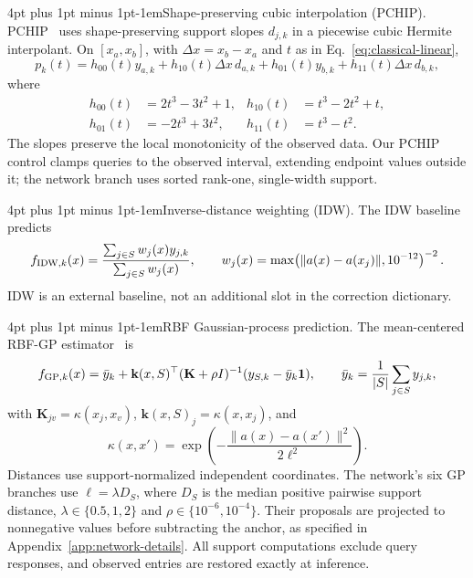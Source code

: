 \documentclass{article}
\makeatletter
\renewcommand{\paragraph}{\@startsection{paragraph}{4}{\z@}
  {4pt plus 1pt minus 1pt}{-1em}{\normalsize\bf}}
\makeatother
\begin{document}
\paragraph{Shape-preserving cubic interpolation (PCHIP).}
PCHIP~\citep{pchip} uses shape-preserving support slopes $d_{j,k}$ in a
piecewise cubic Hermite interpolant. On $[x_a,x_b]$, with
$\Delta x=x_b-x_a$ and $t$ as in Eq.~\eqref{eq:classical-linear},
\begin{equation}
\label{eq:classical-pchip}
 p_k(t)=h_{00}(t)y_{a,k}+h_{10}(t)\Delta x\,d_{a,k}
       +h_{01}(t)y_{b,k}+h_{11}(t)\Delta x\,d_{b,k},
\end{equation}
where
\begin{equation}
\begin{aligned}
 h_{00}(t)&=2t^3-3t^2+1, & h_{10}(t)&=t^3-2t^2+t,\\
 h_{01}(t)&=-2t^3+3t^2, & h_{11}(t)&=t^3-t^2.
\end{aligned}
\end{equation}
The slopes preserve the local monotonicity of the observed data. Our PCHIP
control clamps queries to the observed interval, extending endpoint values
outside it; the network branch uses sorted rank-one, single-width support.

\paragraph{Inverse-distance weighting (IDW).}
The IDW baseline predicts
\begin{equation}
\label{eq:classical-idw}
 f_{{\rm IDW},k}(x)=\frac{\sum_{j\in S}w_j(x)y_{j,k}}
 {\sum_{j\in S}w_j(x)},\qquad
 w_j(x)=\max\!\left(\|a(x)-a(x_j)\|,10^{-12}\right)^{-2}.
\end{equation}
IDW is an external baseline, not an additional slot in the correction dictionary.

\paragraph{RBF Gaussian-process prediction.}
The mean-centered RBF-GP estimator~\citep{gpml} is
\begin{equation}
\label{eq:classical-gp}
 f_{{\rm GP},k}(x)=\bar y_k+
 \mathbf{k}(x,S)^{\top}(\mathbf{K}+\rho I)^{-1}
 (y_{S,k}-\bar y_k\mathbf{1}),\qquad
 \bar y_k=\frac{1}{|S|}\sum_{j\in S}y_{j,k},
\end{equation}
with $\mathbf{K}_{jv}=\kappa(x_j,x_v)$,
$\mathbf{k}(x,S)_j=\kappa(x,x_j)$, and
\begin{equation}
\label{eq:classical-rbf}
 \kappa(x,x')=\exp\!\left(-\frac{\|a(x)-a(x')\|^2}{2\ell^2}\right).
\end{equation}
Distances use support-normalized independent coordinates. The network's six
GP branches use $\ell=\lambda D_S$, where $D_S$ is the median positive pairwise
support distance, $\lambda\in\{0.5,1,2\}$ and
$\rho\in\{10^{-6},10^{-4}\}$. Their proposals are projected to nonnegative
values before subtracting the anchor, as specified in
Appendix~\ref{app:network-details}. All support computations exclude query
responses, and observed entries are restored exactly at inference.
\end{document}
